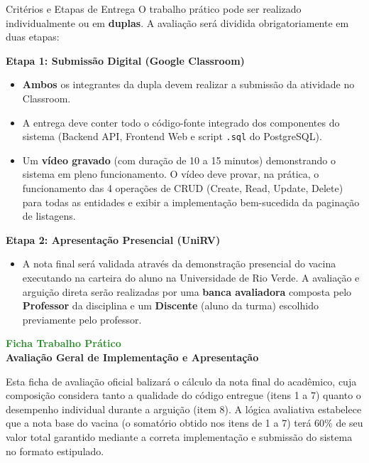 \documentclass[12pt,a4paper]{article}
\begin{document}
\vspace{0.4cm}
\begin{blockbox}{Critérios e Etapas de Entrega}
O trabalho prático pode ser realizado individualmente ou em \textbf{duplas}. A avaliação será dividida obrigatoriamente em duas etapas:

\textbf{Etapa 1: Submissão Digital (Google Classroom)}
\begin{itemize}[leftmargin=*, noitemsep]
    \item \textbf{Ambos} os integrantes da dupla devem realizar a submissão da atividade no Classroom.
    \item A entrega deve conter todo o código-fonte integrado dos componentes do sistema (Backend API, Frontend Web e script \texttt{.sql} do PostgreSQL).
    \item Um \textbf{vídeo gravado} (com duração de 10 a 15 minutos) demonstrando o sistema em pleno funcionamento. O vídeo deve provar, na prática, o funcionamento das 4 operações de CRUD (Create, Read, Update, Delete) para todas as entidades e exibir a implementação bem-sucedida da paginação de listagens.
\end{itemize}

\textbf{Etapa 2: Apresentação Presencial (UniRV)}
\begin{itemize}[leftmargin=*, noitemsep]
    \item A nota final será validada através da demonstração presencial do vacina executando na carteira do aluno na Universidade de Rio Verde. A avaliação e arguição direta serão realizadas por uma \textbf{banca avaliadora} composta pelo \textbf{Professor} da disciplina e um \textbf{Discente} (aluno da turma) escolhido previamente pelo professor.
\end{itemize}
\end{blockbox}

\newpage
\begin{center}
    {\huge \textbf{\textcolor{forestgreen}{Ficha Trabalho Prático}}} \\[0.3cm]
    {\large \textbf{Avaliação Geral de Implementação e Apresentação}} \\[0.8cm]
\end{center}

Esta ficha de avaliação oficial balizará o cálculo da nota final do acadêmico, cuja composição considera tanto a qualidade do código entregue (itens 1 a 7) quanto o desempenho individual durante a arguição (item 8). A lógica avaliativa estabelece que a nota base do vacina (o somatório obtido nos itens de 1 a 7) terá 60\% de seu valor total garantido mediante a correta implementação e submissão do sistema no formato estipulado.
\end{document}
